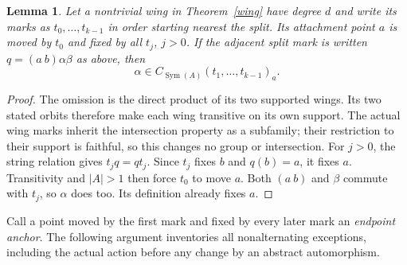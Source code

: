 \documentclass[11pt,a4paper]{article}
\newtheorem{lemma}[theorem]{Lemma}
\newcommand{\Sym}{\operatorname{Sym}}
\begin{document}
\begin{lemma}\label{anchor}
Let a nontrivial wing in Theorem~\ref{wing} have degree $d$ and
write its marks as $t_0,\ldots,t_{k-1}$ in order starting nearest
the split. Its attachment point $a$ is moved by $t_0$ and fixed
by all $t_j$, $j>0$. If the adjacent split mark is written
$q=(a\ b)\alpha\beta$ as above, then
\[
 \alpha\in C_{\Sym(A)}(t_1,\ldots,t_{k-1})_a.
\]
\end{lemma}
\begin{proof}
The omission is the direct product of its two supported wings.
Its two stated orbits therefore make each wing transitive on its
own support. The actual wing marks inherit the intersection
property as a subfamily; their restriction to their support is
faithful, so this changes no group or intersection.
For $j>0$, the string relation gives $t_jq=qt_j$. Since $t_j$
fixes $b$ and $q(b)=a$, it fixes $a$. Transitivity and $|A|>1$
then force $t_0$ to move $a$. Both $(a\ b)$ and $\beta$ commute
with $t_j$, so $\alpha$ does too. Its definition already fixes $a$.
\end{proof}

Call a point moved by the first mark and fixed by every later mark
an \emph{endpoint anchor}. The following argument inventories all
nonalternating exceptions, including the actual action before
any change by an abstract automorphism.
\end{document}
